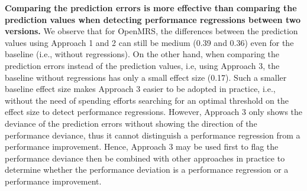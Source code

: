 

\noindent\textbf{Comparing the prediction errors is more effective than comparing the prediction values when detecting performance regressions between two versions.}
We observe that for OpenMRS, the differences between the prediction values using Approach 1 and 2 can still be medium (0.39 and 0.36) even for the baseline (i.e., without regressions).
On the other hand, when comparing the prediction errors instead of the prediction values, i.e, using Approach 3, the baseline without regressions has only a small effect size (0.17).
Such a smaller baseline effect size makes Approach 3 easier to be adopted in practice, i.e., without the need of spending efforts searching for an optimal threshold on the effect size to detect performance regressions. However, Approach 3 only shows the deviance of the prediction errors without showing the direction of the performance deviance, thus it cannot distinguish a performance regression from a performance improvement. Hence, Approach 3 may be used first to flag the performance deviance then be combined with other approaches in practice to determine whether the performance deviation is a performance regression or a performance improvement.


